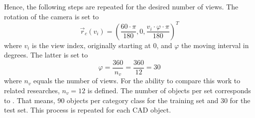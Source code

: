 Hence, the following steps are repeated for the desired number of views.
The rotation of the camera is set to
\begin{equation}
	\vec{r}_c(v_i) = \left(  \frac{60 \cdot \pi}{180}, 0, \frac{v_i \cdot \varphi \cdot \pi}{180} \right)^T
\end{equation}
where $v_i$ is the view index, originally starting at 0, and $\varphi$ the moving interval in degrees.
The latter is set to
\begin{equation}
	\varphi = \frac{360}{n_v} = \frac{360}{12} = 30
\end{equation}
where $n_v$ equals the number of views.
For the ability to compare this work to related researches, $n_v = 12$ is defined.
The number of objects per set corresponds to \cite{Su:2015:MCN:2919332.2919750}.
That means, 90 objects per category class for the training set and 30 for the test set.
This process is repeated for each CAD object.